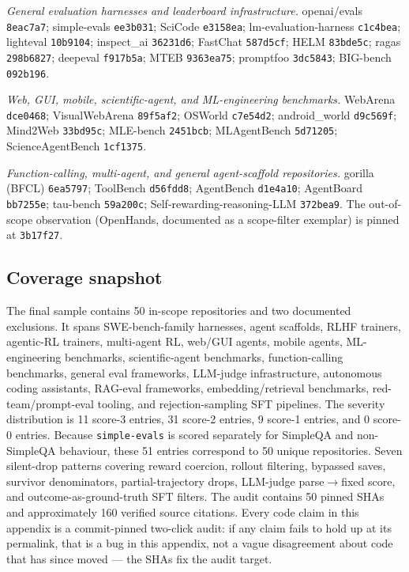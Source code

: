 \documentclass{article}
\begin{document}
\emph{General evaluation harnesses and leaderboard infrastructure.}
openai/evals \texttt{8eac7a7}; simple-evals \texttt{ee3b031};
SciCode \texttt{e3158ea}; lm-evaluation-harness
\texttt{c1c4bea}; lighteval \texttt{10b9104}; inspect\_ai
\texttt{36231d6}; FastChat \texttt{587d5cf}; HELM
\texttt{83bde5c}; ragas \texttt{298b6827}; deepeval
\texttt{f917b5a}; MTEB \texttt{9363ea75}; promptfoo
\texttt{3dc5843}; BIG-bench \texttt{092b196}.

\emph{Web, GUI, mobile, scientific-agent, and ML-engineering benchmarks.}
WebArena \texttt{dce0468}; VisualWebArena \texttt{89f5af2};
OSWorld \texttt{c7e54d2}; android\_world \texttt{d9c569f};
Mind2Web \texttt{33bd95c}; MLE-bench \texttt{2451bcb};
MLAgentBench \texttt{5d71205}; ScienceAgentBench
\texttt{1cf1375}.

\emph{Function-calling, multi-agent, and general agent-scaffold repositories.}
gorilla (BFCL) \texttt{6ea5797}; ToolBench \texttt{d56fdd8};
AgentBench \texttt{d1e4a10}; AgentBoard \texttt{bb7255e};
tau-bench \texttt{59a200c}; Self-rewarding-reasoning-LLM
\texttt{372bea9}. The out-of-scope observation (OpenHands,
documented as a scope-filter exemplar) is pinned at
\texttt{3b17f27}.

\subsection{Coverage snapshot}
\label{app:survey:coverage}

The final sample contains 50 in-scope repositories and two
documented exclusions. It spans SWE-bench-family harnesses,
agent scaffolds,
RLHF trainers, agentic-RL trainers, multi-agent RL, web/GUI
agents, mobile agents, ML-engineering benchmarks,
scientific-agent benchmarks, function-calling benchmarks,
general eval frameworks, LLM-judge infrastructure, autonomous
coding assistants, RAG-eval frameworks, embedding/retrieval
benchmarks, red-team/prompt-eval tooling, and
rejection-sampling SFT pipelines.
The severity distribution is 11 score-3 entries, 31 score-2
entries, 9 score-1 entries, and 0 score-0 entries. Because
\texttt{simple-evals} is scored separately for SimpleQA and
non-SimpleQA behaviour, these 51 entries correspond to 50
unique repositories. Seven silent-drop patterns
covering reward coercion, rollout filtering, bypassed saves,
survivor denominators, partial-trajectory drops, LLM-judge
parse$\to$fixed score, and outcome-as-ground-truth SFT
filters.
The audit contains 50 pinned SHAs and approximately 160
verified source citations. Every code claim in this appendix is a
commit-pinned two-click audit: if any claim fails to hold up
at its permalink, that is a bug in this appendix, not a vague
disagreement about code that has since moved --- the SHAs fix
the audit target.
\end{document}
